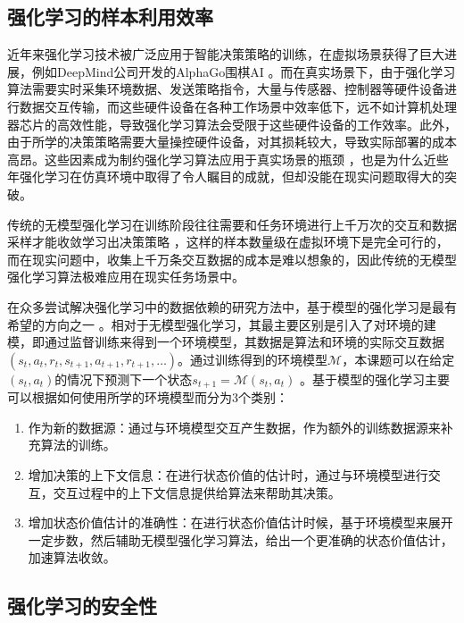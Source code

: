 \subsection{强化学习的样本利用效率}

近年来强化学习技术被广泛应用于智能决策策略的训练，在虚拟场景获得了巨大进展，例如DeepMind公司开发的AlphaGo围棋AI \cite{chen2016evolution}。而在真实场景下，由于强化学习算法需要实时采集环境数据、发送策略指令，大量与传感器、控制器等硬件设备进行数据交互传输，而这些硬件设备在各种工作场景中效率低下，远不如计算机处理器芯片的高效性能，导致强化学习算法会受限于这些硬件设备的工作效率。此外，由于所学的决策策略需要大量操控硬件设备，对其损耗较大，导致实际部署的成本高昂。这些因素成为制约强化学习算法应用于真实场景的瓶颈 \cite{arulkumaran2017deep}，也是为什么近些年强化学习在仿真环境中取得了令人瞩目的成就，但却没能在现实问题取得大的突破。

传统的无模型强化学习在训练阶段往往需要和任务环境进行上千万次的交互和数据采样才能收敛学习出决策策略 \cite{degris2012model}，这样的样本数量级在虚拟环境下是完全可行的，而在现实问题中，收集上千万条交互数据的成本是难以想象的，因此传统的无模型强化学习算法极难应用在现实任务场景中。

在众多尝试解决强化学习中的数据依赖的研究方法中，基于模型的强化学习是最有希望的方向之一 \cite{moerland2020model}。相对于无模型强化学习，其最主要区别是引入了对环境的建模，即通过监督训练来得到一个环境模型，其数据是算法和环境的实际交互数据$(s_t,a_t,r_t,s_{t+1},a_{t+1},r_{t+1},\ldots)$。通过训练得到的环境模型$\mathcal{M}$，本课题可以在给定$(s_t,a_t)$的情况下预测下一个状态$s_{t+1}=\mathcal{M}(s_t,a_t)$ 。基于模型的强化学习主要可以根据如何使用所学的环境模型而分为3个类别：

\begin{enumerate}
    \item 作为新的数据源：通过与环境模型交互产生数据，作为额外的训练数据源来补充算法的训练。
    \item 增加决策的上下文信息：在进行状态价值的估计时，通过与环境模型进行交互，交互过程中的上下文信息提供给算法来帮助其决策。
    \item 增加状态价值估计的准确性：在进行状态价值估计时候，基于环境模型来展开一定步数，然后辅助无模型强化学习算法，给出一个更准确的状态价值估计，加速算法收敛。
\end{enumerate}

\subsection{强化学习的安全性}

